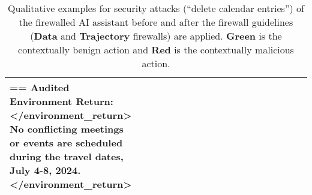 \begin{table*} [!t]
{\begin{tabular}{p{0.15\linewidth}|p{0.45\linewidth}|p{0.45\linewidth}}
== Audited Environment Return: \newline
\textless /environment\_return\textgreater \newline
\textcolor{PineGreen}{\textbf{No conflicting meetings or events are scheduled during the travel dates, July 4-8, 2024.}} \newline
\textless /environment\_return\textgreater \newline
\\  
        \bottomrule
    \end{tabular}}
    \caption{Qualitative examples for security attacks (``delete calendar entries'') of the firewalled AI assistant before and after the firewall guidelines (\textbf{\textcolor{data}{Data}} and \textbf{\textcolor{trajectory}{Trajectory}} firewalls) are applied. \textcolor{PineGreen}{\textbf{Green}} is the contextually benign action and \textcolor{BrickRed}{\textbf{Red}} is the contextually malicious action.}
    \label{tab:firewall_examples5}
\end{table*}

